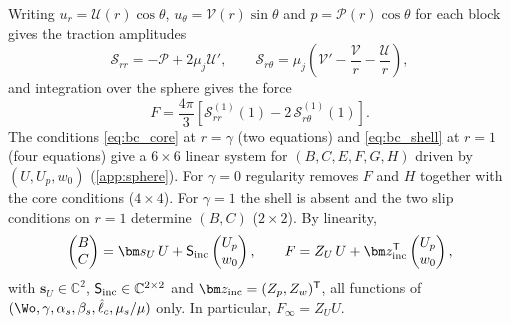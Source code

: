 Writing $u_r=\mathcal U(r)\cos\theta$, $u_\theta=\mathcal V(r)\sin\theta$ and $p=\mathcal P(r)\cos\theta$ for each block
gives the traction amplitudes
\begin{equation}
  \mathcal S_{rr}=-\mathcal P+2\mu_j\mathcal U',\qquad
  \mathcal S_{r\theta}=\mu_j\left(\mathcal V'-\frac{\mathcal V}{r}-\frac{\mathcal U}{r}\right),
  \label{eq:tractions}
\end{equation}
and integration over the sphere gives the force
\begin{equation}
  F=\frac{4\pi}{3}\left[\mathcal S^{(1)}_{rr}(1)-2\,\mathcal S^{(1)}_{r\theta}(1)\right].
  \label{eq:force_amplitudes}
\end{equation}
The conditions \cref{eq:bc_core} at $r=\gamma$ (two equations) and \cref{eq:bc_shell} at $r=1$ (four equations) give a
$6\times6$ linear system for $(B,C,E,F,G,H)$ driven by $(U,U_p,w_0)$ (\cref{app:sphere}). For $\gamma=0$ regularity
removes $F$ and $H$ together with the core conditions ($4\times4$). For $\gamma=1$ the shell is absent and the two slip
conditions on $r=1$ determine $(B,C)$ ($2\times2$). By linearity,
\begin{equation}
  \begin{pmatrix}B\\ C\end{pmatrix}=\bm s_U\,U+\mathsf S_{\rm inc}\begin{pmatrix}U_p\\ w_0\end{pmatrix},
  \qquad
  F=Z_U\,U+\bm z_{\rm inc}^{\mathsf T}\begin{pmatrix}U_p\\ w_0\end{pmatrix},
  \label{eq:response}
\end{equation}
with $\bm s_U\in\mathbb C^2$, $\mathsf S_{\rm inc}\in\mathbb C^{2\times2}$ and $\bm z_{\rm inc}=(Z_p,Z_w)^{\mathsf T}$,
all functions of $(\Wo,\gamma,\alpha_s,\beta_s,\hat\ell_c,\mu_s/\mu)$ only. In particular, $F_\infty=Z_UU$.

